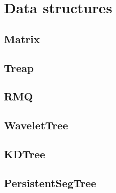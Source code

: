 \chapter{Data structures}

\section{Matrix}
\section{Treap}
\section{RMQ}
\section{WaveletTree}
\section{KDTree}
\section{PersistentSegTree}
